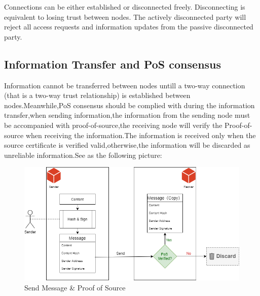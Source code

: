 \documentclass{article}
\begin{document}
    Connections can be either established or disconnected freely. Disconnecting is equivalent to losing trust between nodes. The actively disconnected party will reject all access requests and information updates from the passive disconnected party.
\subsection{Information Transfer and PoS consensus}\label{msg_and_pos}
    Information cannot be transferred between nodes untill a two-way connection (that is a two-way trust relationship) is established between nodes.Meanwhile,PoS consensus should be complied with during the information transfer,when sending information,the information from the sending node must be accompanied with proof-of-source,the receiving node will verify the Proof-of-source when receiving the information.The information is received only when the source certificate is verified valid,otherwise,the information will be discarded as unreliable information.See as the following picture: 

    \begin{figure}[H]
        \centering
        \includegraphics[width=\textwidth]{figures-pos.png}
        \caption{Send Message \& Proof of Source}
    \end{figure}
\end{document}
